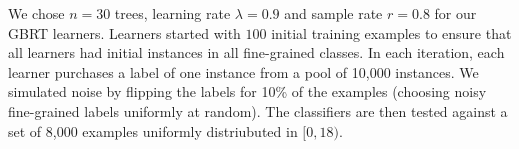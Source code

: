 We chose $n=30$ trees, learning rate $\lambda=0.9$ and sample rate $r=0.8$ for our GBRT
learners.  Learners started with $100$ initial training
examples to ensure that all learners had initial instances in all fine-grained classes.
In each iteration, each learner purchases a label of  one instance from a pool of 10,000
instances.  We simulated noise by flipping the labels for 10\% of the examples
(choosing noisy fine-grained labels uniformly at random).
The classifiers are then tested against a set of 8,000 examples uniformly distriubuted in $[0,18)$.

\begin{figure}[tb]
	\centering
	\\
\end{figure}
